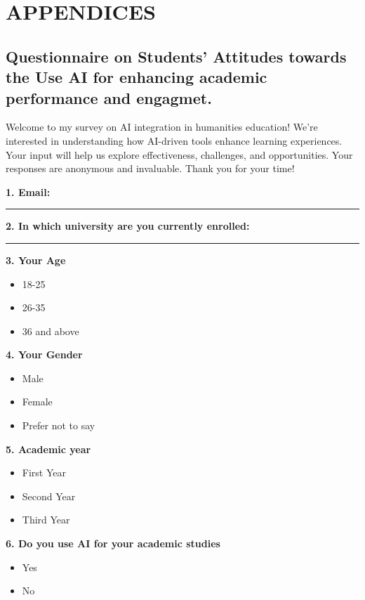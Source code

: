\chapter{APPENDICES}
\begin{Center}
	\section{ Questionnaire on Students' Attitudes towards the Use AI for enhancing academic performance and engagmet.}
	Welcome to my survey on AI integration in humanities education! We're interested
	in understanding how AI-driven tools enhance learning experiences. Your input
	will help us explore effectiveness, challenges, and opportunities. Your
	responses are anonymous and invaluable. Thank you for your time!


\end{Center}

\noindent\textbf{1. Email: }

\noindent\rule{15cm}{0.4pt}

\noindent\textbf{2. In which university are you currently enrolled:}

\noindent\rule{15cm}{0.4pt}



\noindent\textbf{3.  Your Age}
\begin{itemize}
	\item[\circlebox] 18-25
	\item[\circlebox] 26-35
	\item[\circlebox] 36 and above
\end{itemize}

\noindent\textbf{4.  Your Gender}
\begin{itemize}
	\item[\circlebox] Male
	\item[\circlebox] Female
	\item[\circlebox] Prefer not to say
\end{itemize}

\noindent\textbf{5.  Academic year}
\begin{itemize}
	\item[\circlebox] First Year
	\item[\circlebox] Second Year
	\item[\circlebox] Third Year
\end{itemize}

\noindent\textbf{6.  Do you use AI for your academic studies}
\begin{itemize}
	\item[\circlebox] Yes
	\item[\circlebox] No
\end{itemize}


